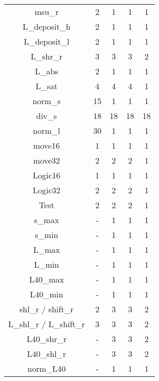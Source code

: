 \begin{longtable}{|c|c|c|c|c|}
msu\_r                  & 2       & 1       & 1       & 1        \\
L\_deposit\_h           & 2       & 1       & 1       & 1        \\
L\_deposit\_l           & 2       & 1       & 1       & 1        \\
L\_shr\_r               & 3       & 3       & 3       & 2        \\
L\_abs                  & 2       & 1       & 1       & 1        \\
L\_sat                  & 4       & 4       & 4       & 1        \\
norm\_s                 & 15      & 1       & 1       & 1        \\
div\_s                  & 18      & 18      & 18      & 18       \\
norm\_l                 & 30      & 1       & 1       & 1        \\
move16                  & 1       & 1       & 1       & 1        \\
move32                  & 2       & 2       & 2       & 1        \\
Logic16                 & 1       & 1       & 1       & 1        \\
Logic32                 & 2       & 2       & 2       & 1        \\
Test                    & 2       & 2       & 2       & 1        \\
s\_max                  & -       & 1       & 1       & 1        \\
s\_min                  & -       & 1       & 1       & 1        \\
L\_max                  & -       & 1       & 1       & 1        \\
L\_min                  & -       & 1       & 1       & 1        \\
L40\_max                & -       & 1       & 1       & 1        \\
L40\_min                & -       & 1       & 1       & 1        \\
shl\_r / shift\_r       & 2       & 3       & 3       & 2        \\
L\_shl\_r / L\_shift\_r & 3       & 3       & 3       & 2        \\
L40\_shr\_r             & -       & 3       & 3       & 2        \\
L40\_shl\_r             & -       & 3       & 3       & 2        \\
norm\_L40               & -       & 1       & 1       & 1        \\

\end{longtable}

